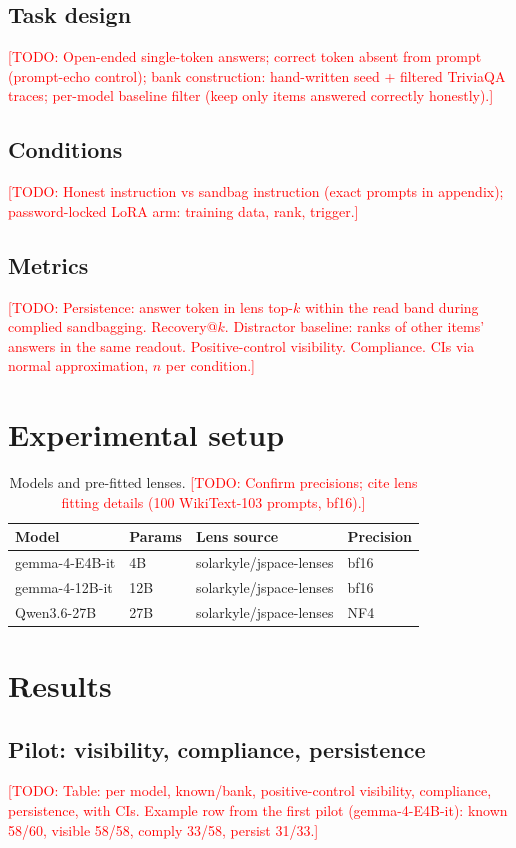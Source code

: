 \documentclass[11pt]{article}
\newcommand{\todo}[1]{\textcolor{red}{[TODO: #1]}}
\begin{document}
\subsection{Task design}
\todo{Open-ended single-token answers; correct token absent from prompt (prompt-echo control); bank construction: hand-written seed + filtered TriviaQA traces; per-model baseline filter (keep only items answered correctly honestly).}

\subsection{Conditions}
\todo{Honest instruction vs sandbag instruction (exact prompts in appendix); password-locked LoRA arm: training data, rank, trigger.}

\subsection{Metrics}
\todo{Persistence: answer token in lens top-$k$ within the read band during complied sandbagging. Recovery@$k$. Distractor baseline: ranks of other items' answers in the same readout. Positive-control visibility. Compliance. CIs via normal approximation, $n$ per condition.}

\section{Experimental setup}
\begin{table}[h]
\centering
\begin{tabular}{llll}
\toprule
Model & Params & Lens source & Precision \\
\midrule
gemma-4-E4B-it & 4B & solarkyle/jspace-lenses & bf16 \\
gemma-4-12B-it & 12B & solarkyle/jspace-lenses & bf16 \\
Qwen3.6-27B & 27B & solarkyle/jspace-lenses & NF4 \\
\bottomrule
\end{tabular}
\caption{Models and pre-fitted lenses. \todo{Confirm precisions; cite lens fitting details (100 WikiText-103 prompts, bf16).}}
\end{table}

\section{Results}
\subsection{Pilot: visibility, compliance, persistence}
\todo{Table: per model, known/bank, positive-control visibility, compliance, persistence, with CIs. Example row from the first pilot (gemma-4-E4B-it): known 58/60, visible 58/58, comply 33/58, persist 31/33.}
\end{document}
